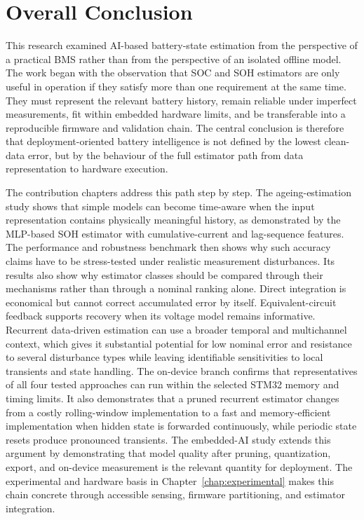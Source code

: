 \documentclass[
    a4paper,
    12pt,
    titlepage,
    bibliography=totoc,
    twoside=on,
    parskip=false,
    numbers=noenddot,
    cleardoublepage=empty,
    DIV=12,
    BCOR=12.0mm,
    headheight=36pt,
    headings=openright
]{scrreprt}
\begin{document}
\section{Overall Conclusion}
This research examined AI-based battery-state estimation from the perspective of a practical BMS rather than from the perspective of an isolated offline model. The work began with the observation that SOC and SOH estimators are only useful in operation if they satisfy more than one requirement at the same time. They must represent the relevant battery history, remain reliable under imperfect measurements, fit within embedded hardware limits, and be transferable into a reproducible firmware and validation chain. The central conclusion is therefore that deployment-oriented battery intelligence is not defined by the lowest clean-data error, but by the behaviour of the full estimator path from data representation to hardware execution.

The contribution chapters address this path step by step. The ageing-estimation study shows that simple models can become time-aware when the input representation contains physically meaningful history, as demonstrated by the MLP-based SOH estimator with cumulative-current and lag-sequence features. The performance and robustness benchmark then shows why such accuracy claims have to be stress-tested under realistic measurement disturbances. Its results also show why estimator classes should be compared through their mechanisms rather than through a nominal ranking alone. Direct integration is economical but cannot correct accumulated error by itself. Equivalent-circuit feedback supports recovery when its voltage model remains informative. Recurrent data-driven estimation can use a broader temporal and multichannel context, which gives it substantial potential for low nominal error and resistance to several disturbance types while leaving identifiable sensitivities to local transients and state handling. The on-device branch confirms that representatives of all four tested approaches can run within the selected STM32 memory and timing limits. It also demonstrates that a pruned recurrent estimator changes from a costly rolling-window implementation to a fast and memory-efficient implementation when hidden state is forwarded continuously, while periodic state resets produce pronounced transients. The embedded-AI study extends this argument by demonstrating that model quality after pruning, quantization, export, and on-device measurement is the relevant quantity for deployment. The experimental and hardware basis in Chapter~\ref{chap:experimental} makes this chain concrete through accessible sensing, firmware partitioning, and estimator integration.
\end{document}
